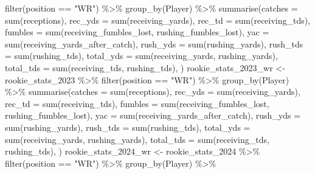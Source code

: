 \documentclass[
  letterpaper,
  DIV=11,
  numbers=noendperiod]{scrartcl}
\newenvironment{Shaded}{\begin{snugshade}}{\end{snugshade}}
\newcommand{\AttributeTok}[1]{\textcolor[rgb]{0.40,0.45,0.13}{#1}}
\newcommand{\FunctionTok}[1]{\textcolor[rgb]{0.28,0.35,0.67}{#1}}
\newcommand{\NormalTok}[1]{\textcolor[rgb]{0.00,0.23,0.31}{#1}}
\newcommand{\OtherTok}[1]{\textcolor[rgb]{0.00,0.23,0.31}{#1}}
\newcommand{\SpecialCharTok}[1]{\textcolor[rgb]{0.37,0.37,0.37}{#1}}
\newcommand{\StringTok}[1]{\textcolor[rgb]{0.13,0.47,0.30}{#1}}
\begin{document}
\begin{Shaded}
\begin{Highlighting}[]
  \FunctionTok{filter}\NormalTok{(position }\SpecialCharTok{==} \StringTok{"WR"}\NormalTok{) }\SpecialCharTok{\%\textgreater{}\%}
  \FunctionTok{group\_by}\NormalTok{(Player) }\SpecialCharTok{\%\textgreater{}\%}
  \FunctionTok{summarise}\NormalTok{(}\AttributeTok{catches =} \FunctionTok{sum}\NormalTok{(receptions),}
            \AttributeTok{rec\_yds =} \FunctionTok{sum}\NormalTok{(receiving\_yards),}
            \AttributeTok{rec\_td =} \FunctionTok{sum}\NormalTok{(receiving\_tds),}
            \AttributeTok{fumbles =} \FunctionTok{sum}\NormalTok{(receiving\_fumbles\_lost, rushing\_fumbles\_lost),}
            \AttributeTok{yac =} \FunctionTok{sum}\NormalTok{(receiving\_yards\_after\_catch),}
            \AttributeTok{rush\_yds =} \FunctionTok{sum}\NormalTok{(rushing\_yards),}
            \AttributeTok{rush\_tds =} \FunctionTok{sum}\NormalTok{(rushing\_tds),}
            \AttributeTok{total\_yds =} \FunctionTok{sum}\NormalTok{(receiving\_yards, rushing\_yards),}
            \AttributeTok{total\_tds =} \FunctionTok{sum}\NormalTok{(receiving\_tds, rushing\_tds),}
\NormalTok{  )}
\NormalTok{rookie\_stats\_2023\_wr }\OtherTok{\textless{}{-}}\NormalTok{ rookie\_stats\_2023 }\SpecialCharTok{\%\textgreater{}\%}
  \FunctionTok{filter}\NormalTok{(position }\SpecialCharTok{==} \StringTok{"WR"}\NormalTok{) }\SpecialCharTok{\%\textgreater{}\%}
  \FunctionTok{group\_by}\NormalTok{(Player) }\SpecialCharTok{\%\textgreater{}\%}
  \FunctionTok{summarise}\NormalTok{(}\AttributeTok{catches =} \FunctionTok{sum}\NormalTok{(receptions),}
            \AttributeTok{rec\_yds =} \FunctionTok{sum}\NormalTok{(receiving\_yards),}
            \AttributeTok{rec\_td =} \FunctionTok{sum}\NormalTok{(receiving\_tds),}
            \AttributeTok{fumbles =} \FunctionTok{sum}\NormalTok{(receiving\_fumbles\_lost, rushing\_fumbles\_lost),}
            \AttributeTok{yac =} \FunctionTok{sum}\NormalTok{(receiving\_yards\_after\_catch),}
            \AttributeTok{rush\_yds =} \FunctionTok{sum}\NormalTok{(rushing\_yards),}
            \AttributeTok{rush\_tds =} \FunctionTok{sum}\NormalTok{(rushing\_tds),}
            \AttributeTok{total\_yds =} \FunctionTok{sum}\NormalTok{(receiving\_yards, rushing\_yards),}
            \AttributeTok{total\_tds =} \FunctionTok{sum}\NormalTok{(receiving\_tds, rushing\_tds),}
\NormalTok{  )}
\NormalTok{rookie\_stats\_2024\_wr }\OtherTok{\textless{}{-}}\NormalTok{ rookie\_stats\_2024 }\SpecialCharTok{\%\textgreater{}\%}
  \FunctionTok{filter}\NormalTok{(position }\SpecialCharTok{==} \StringTok{"WR"}\NormalTok{) }\SpecialCharTok{\%\textgreater{}\%}
  \FunctionTok{group\_by}\NormalTok{(Player) }\SpecialCharTok{\%\textgreater{}\%}

\end{Highlighting}
\end{Shaded}
\end{document}
